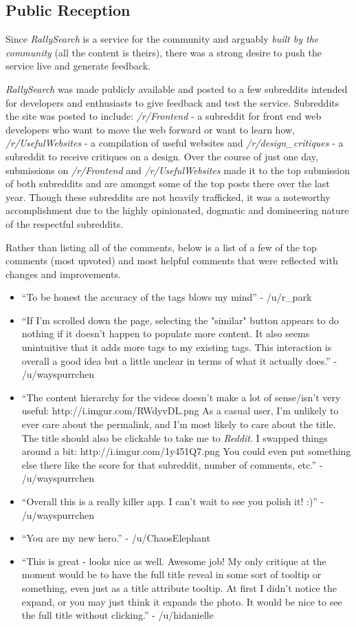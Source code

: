 \documentclass[msc,oneside]{ubcthesis}%
\begin{document}
\subsection{Public Reception}
Since \textit{RallySearch} is a service for the community and arguably \textit{built by the community} (all the content is theirs), there was a strong desire to push the service live and generate feedback.
\par
\textit{RallySearch} was made publicly available and posted to a few subreddits intended for developers and enthusiasts to give feedback and test the service. Subreddits the site was posted to include: \textit{/r/Frontend} - a subreddit for front end web developers who want to move the web forward or want to learn how, \textit{/r/UsefulWebsites} - a compilation of useful websites and \textit{/r/design\_critiques} - a subreddit to receive critiques on a design. Over the course of just one day, submissions on \textit{/r/Frontend} and \textit{/r/UsefulWebsites} made it to the top submission of both subreddits and are amongst some of the top posts there over the last year. Though these subreddits are not heavily trafficked, it was a noteworthy accomplishment due to the highly opinionated, dogmatic and domineering nature of the respectful subreddits.
\par
Rather than listing all of the comments, below is a list of a few of the top comments (most upvoted) and most helpful comments that were reflected with changes and improvements.
\begin{itemize}
\item{``To be honest the accuracy of the tags blows my mind'' - /u/r\_park}
\item{``If I'm scrolled down the page, selecting the "similar" button appears to do nothing if it doesn't happen to populate more content. It also seems unintuitive that it adds more tags to my existing tags. This interaction is overall a good idea but a little unclear in terms of what it actually does.'' - /u/wayspurrchen}
\item{``The content hierarchy for the videos doesn't make a lot of sense/isn't very useful: http://i.imgur.com/RWdyvDL.png As a casual user, I'm unlikely to ever care about the permalink, and I'm most likely to care about the title. The title should also be clickable to take me to \textit{Reddit}. I swapped things around a bit: http://i.imgur.com/1y451Q7.png You could even put something else there like the score for that subreddit, number of comments, etc.'' - /u/wayspurrchen}
\item{``Overall this is a really killer app. I can't wait to see you polish it! :)'' - /u/wayspurrchen}
\item{``You are my new hero.'' - /u/ChaosElephant}
\item{``This is great - looks nice as well. Awesome job!
My only critique at the moment would be to have the full title reveal in some sort of tooltip or something, even just as a title attribute tooltip. At first I didn't notice the expand, or you may just think it expands the photo. It would be nice to see the full title without clicking.'' - /u/hidanielle}
\end{itemize}
\end{document}

